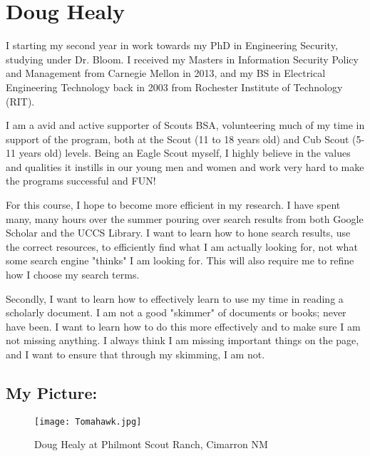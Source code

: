 \documentclass{article}
\begin{document}
\section{Doug Healy}

I starting my second year in work towards my PhD in Engineering Security, studying under Dr. Bloom. I received my Masters in Information Security Policy and Management from Carnegie Mellon in 2013, and my BS in Electrical Engineering Technology back in 2003 from Rochester Institute of Technology (RIT). 

I am a avid and active supporter of Scouts BSA, volunteering much of my time in support of the program, both at the Scout (11 to 18 years old) and Cub Scout (5-11 years old) levels. Being an Eagle Scout myself, I highly believe in the values and qualities it instills in our young men and women and work very hard to make the programs successful and FUN!  

For this course, I hope to become more efficient in my research. I have spent many, many hours over the summer pouring over search results from both Google Scholar and the UCCS Library. I want to learn how to hone search results, use the correct resources, to efficiently find what I am actually looking for, not what some search engine "thinks" I am looking for. This will also require me to refine how I choose my search terms.  

Secondly, I want to learn how to effectively learn to use my time in reading a scholarly document. I am not a good "skimmer" of documents or books; never have been. I want to learn how to do this more effectively and to make sure I am not missing anything. I always think I am missing important things on the page, and I want to ensure that through my skimming, I am not.   

\subsection{My Picture: }
\begin{figure}[htp]
    \centering
    \texttt{[image: Tomahawk.jpg]}
    \caption{Doug Healy at Philmont Scout Ranch, Cimarron NM}
 \end{figure}
\end{document}
